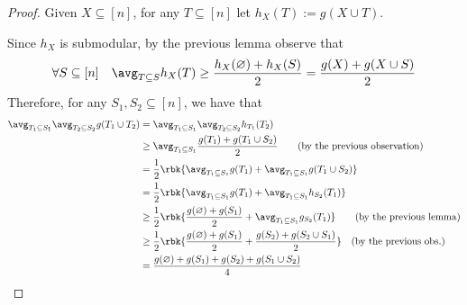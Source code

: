 \documentclass[a4paper, 12pt]{report}
\begin{document}
    \begin{proof}
        Given $X \subseteq [n]$, for any $T \subseteq [n]$ let $h_X(T) := g(X \cup T)$.


        Since $h_X$ is submodular, by the previous lemma observe that $$\forall S \subseteq [n] \quad \avg_{T \subseteq S}{h_X(T)} \ge \dfrac{h_X(\varnothing) + h_X(S)}{2} = \dfrac{g(X) + g(X \cup S)}{2}$$ Therefore, for any $S_1, S_2 \subseteq [n]$, we have that
        \begin{equation*}
            \begin{split}
                \avg_{T_1 \subseteq S_1}{\avg_{T_2 \subseteq S_2}{g(T_1 \cup T_2)}} &= \avg_{T_1 \subseteq S_1}{\avg_{T_2 \subseteq S_2}{h_{T_1}(T_2)}} \\
                                                                                    &\ge \avg_{T_1 \subseteq S_1}{\dfrac{g(T_1) + g(T_1 \cup S_2)}{2}} \quad \quad (\mathrm{by \ the \ previous \ observation})\\
                                                                                    &= \dfrac{1}{2}\rbk{\avg_{T_1 \subseteq S_1}{g(T_1)} + \avg_{T_1 \subseteq S_1}{g(T_1 \cup S_2)}} \\
                                                                                    &= \dfrac{1}{2} \rbk{\avg_{T_1 \subseteq S_1}{g(T_1)} + \avg_{T_1 \subseteq S_1}{h_{S_2}(T_1)}} \\
                                                                                    &\ge \dfrac{1}{2} \rbk{\dfrac{g(\varnothing) + g(S_1)}{2} + \avg_{T_1 \subseteq S_1}{g_{S_2}(T_1)}} \quad \quad (\mathrm{by \ the \ previous \ lemma}) \\
                                                                                    &\ge \dfrac{1}{2} \rbk{\dfrac{g(\varnothing) + g(S_1)}{2} + \dfrac{g(S_2) + g(S_2 \cup S_1)}{2}} \quad (\mathrm{by \ the \ previous \ obs.}) \\
                                                                                    &= \dfrac{g(\varnothing) + g(S_1) + g(S_2) + g(S_1 \cup S_2)}{4}
            \end{split}
        \end{equation*}
    \end{proof}
\end{document}
